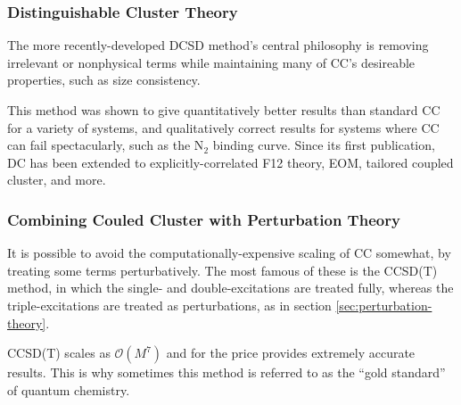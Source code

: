 \subsubsection{Distinguishable Cluster Theory}

The more recently-developed \gls{DCSD} method's central philosophy is removing irrelevant or nonphysical terms while maintaining many of CC's desireable properties, such as size consistency.\cite{katsCommunication2013}

This method was shown to give quantitatively better results than standard CC for a variety of systems, and qualitatively correct results for systems where CC can fail spectacularly, such as the N$_2$ binding curve. Since its first publication, \gls{DC} has been extended to explicitly-correlated F12 theory,\cite{katsAccurate2015} \gls{EOM},\cite{rishiExcited2017} tailored coupled cluster,\cite{vitaleFCIQMCTailored2020} and more.

\subsubsection{Combining Couled Cluster with Perturbation Theory}

It is possible to avoid the computationally-expensive scaling of CC somewhat, by treating some terms perturbatively. The most famous of these is the \gls{CCSD(T)} method,\cite{raghavachariFifthorder1989} in which the single- and double-excitations are treated fully, whereas the triple-excitations are treated as perturbations, as in section \ref{sec:perturbation-theory}.

\gls{CCSD(T)} scales as $\mathcal{O}(M^7)$ and for the price provides extremely accurate results. This is why sometimes this method is referred to as the ``gold standard'' of quantum chemistry.


